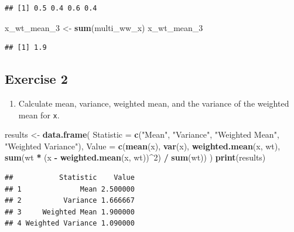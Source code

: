 \documentclass[
  doc]{apa6}
\newenvironment{Shaded}{\begin{snugshade}}{\end{snugshade}}
\newcommand{\AttributeTok}[1]{\textcolor[rgb]{0.13,0.29,0.53}{#1}}
\newcommand{\DecValTok}[1]{\textcolor[rgb]{0.00,0.00,0.81}{#1}}
\newcommand{\FunctionTok}[1]{\textcolor[rgb]{0.13,0.29,0.53}{\textbf{#1}}}
\newcommand{\NormalTok}[1]{#1}
\newcommand{\OtherTok}[1]{\textcolor[rgb]{0.56,0.35,0.01}{#1}}
\newcommand{\SpecialCharTok}[1]{\textcolor[rgb]{0.81,0.36,0.00}{\textbf{#1}}}
\newcommand{\StringTok}[1]{\textcolor[rgb]{0.31,0.60,0.02}{#1}}
\providecommand{\tightlist}{%
  \setlength{\itemsep}{0pt}\setlength{\parskip}{0pt}}
\begin{document}
\begin{verbatim}
## [1] 0.5 0.4 0.6 0.4
\end{verbatim}

\begin{Shaded}
\begin{Highlighting}[]
\NormalTok{x\_wt\_mean\_3 }\OtherTok{\textless{}{-}} \FunctionTok{sum}\NormalTok{(multi\_ww\_x)}
\NormalTok{x\_wt\_mean\_3}
\end{Highlighting}
\end{Shaded}

\begin{verbatim}
## [1] 1.9
\end{verbatim}

\newpage

\subsection{Exercise 2}\label{exercise-2}

\begin{enumerate}
\def\labelenumi{\alph{enumi})}
\tightlist
\item
  Calculate mean, variance, weighted mean, and the variance of the weighted mean for \texttt{x}.
\end{enumerate}

\begin{Shaded}
\begin{Highlighting}[]
\NormalTok{results }\OtherTok{\textless{}{-}} \FunctionTok{data.frame}\NormalTok{(}
  \AttributeTok{Statistic =} \FunctionTok{c}\NormalTok{(}\StringTok{"Mean"}\NormalTok{, }\StringTok{"Variance"}\NormalTok{, }\StringTok{"Weighted Mean"}\NormalTok{, }\StringTok{"Weighted Variance"}\NormalTok{),}
  \AttributeTok{Value =} \FunctionTok{c}\NormalTok{(}\FunctionTok{mean}\NormalTok{(x), }\FunctionTok{var}\NormalTok{(x), }\FunctionTok{weighted.mean}\NormalTok{(x, wt), }\FunctionTok{sum}\NormalTok{(wt }\SpecialCharTok{*}\NormalTok{ (x }\SpecialCharTok{{-}} \FunctionTok{weighted.mean}\NormalTok{(x, wt))}\SpecialCharTok{\^{}}\DecValTok{2}\NormalTok{) }\SpecialCharTok{/} \FunctionTok{sum}\NormalTok{(wt))}
\NormalTok{)}
\FunctionTok{print}\NormalTok{(results)}
\end{Highlighting}
\end{Shaded}

\begin{verbatim}
##           Statistic    Value
## 1              Mean 2.500000
## 2          Variance 1.666667
## 3     Weighted Mean 1.900000
## 4 Weighted Variance 1.090000
\end{verbatim}
\end{document}
